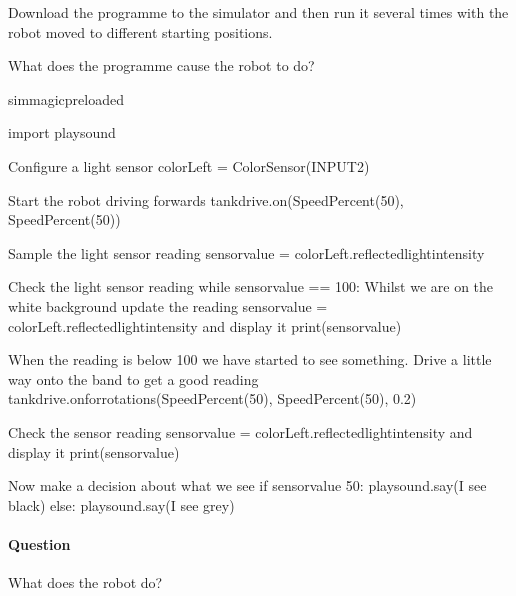 \documentclass[letterpaper,10pt,english]{sphinxmanual}
\begin{document}
{Download the programme to the simulator and then run it several times with the robot moved to different starting positions.

What does the programme cause the robot to do?

{
\begin{sphinxVerbatim}[commandchars=\\\{\}]
\llap{\color{nbsphinxin}[ ]:\,\hspace{\fboxrule}\hspace{\fboxsep}}\PYGZpc{}\PYGZpc{}sim\PYGZus{}magic\PYGZus{}preloaded

import playsound

\PYGZsh{} Configure a light sensor
colorLeft = ColorSensor(INPUT\PYGZus{}2)

\PYGZsh{} Start the robot driving forwards
tank\PYGZus{}drive.on(SpeedPercent(50), SpeedPercent(50))

\PYGZsh{}Sample the light sensor reading
sensor\PYGZus{}value = colorLeft.reflected\PYGZus{}light\PYGZus{}intensity

\PYGZsh{}Check the light sensor reading
while sensor\PYGZus{}value == 100:
    \PYGZsh{} Whilst we are on the white background
    \PYGZsh{} update the reading
    sensor\PYGZus{}value = colorLeft.reflected\PYGZus{}light\PYGZus{}intensity
    \PYGZsh{} and display it
    print(sensor\PYGZus{}value)

\PYGZsh{} When the reading is below 100
\PYGZsh{} we have started to see something.
\PYGZsh{} Drive a little way onto the band to get a good reading
tank\PYGZus{}drive.on\PYGZus{}for\PYGZus{}rotations(SpeedPercent(50), SpeedPercent(50), 0.2)

\PYGZsh{}Check the sensor reading
sensor\PYGZus{}value = colorLeft.reflected\PYGZus{}light\PYGZus{}intensity
\PYGZsh{} and display it
print(sensor\PYGZus{}value)

\PYGZsh{} Now make a decision about what we see
if sensor\PYGZus{}value \PYGZlt{} 50:
    playsound.say(\PYGZdq{}I see black\PYGZdq{})
else:
    playsound.say(\PYGZdq{}I see grey\PYGZdq{})
\end{sphinxVerbatim}
}


\paragraph{Question}
\label{\detokenize{content/02_Robot_Lab/Section_00_02:Question}}
What does the robot do?


}
\end{document}
